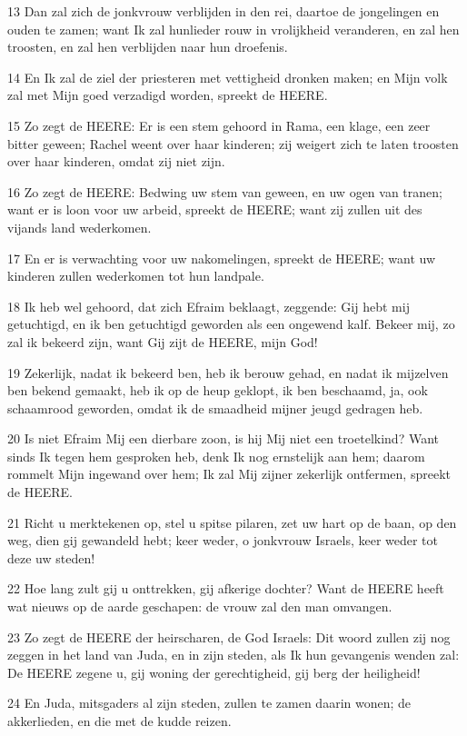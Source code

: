 \par 13 Dan zal zich de jonkvrouw verblijden in den rei, daartoe de jongelingen en ouden te zamen; want Ik zal hunlieder rouw in vrolijkheid veranderen, en zal hen troosten, en zal hen verblijden naar hun droefenis.
\par 14 En Ik zal de ziel der priesteren met vettigheid dronken maken; en Mijn volk zal met Mijn goed verzadigd worden, spreekt de HEERE.
\par 15 Zo zegt de HEERE: Er is een stem gehoord in Rama, een klage, een zeer bitter geween; Rachel weent over haar kinderen; zij weigert zich te laten troosten over haar kinderen, omdat zij niet zijn.
\par 16 Zo zegt de HEERE: Bedwing uw stem van geween, en uw ogen van tranen; want er is loon voor uw arbeid, spreekt de HEERE; want zij zullen uit des vijands land wederkomen.
\par 17 En er is verwachting voor uw nakomelingen, spreekt de HEERE; want uw kinderen zullen wederkomen tot hun landpale.
\par 18 Ik heb wel gehoord, dat zich Efraim beklaagt, zeggende: Gij hebt mij getuchtigd, en ik ben getuchtigd geworden als een ongewend kalf. Bekeer mij, zo zal ik bekeerd zijn, want Gij zijt de HEERE, mijn God!
\par 19 Zekerlijk, nadat ik bekeerd ben, heb ik berouw gehad, en nadat ik mijzelven ben bekend gemaakt, heb ik op de heup geklopt, ik ben beschaamd, ja, ook schaamrood geworden, omdat ik de smaadheid mijner jeugd gedragen heb.
\par 20 Is niet Efraim Mij een dierbare zoon, is hij Mij niet een troetelkind? Want sinds Ik tegen hem gesproken heb, denk Ik nog ernstelijk aan hem; daarom rommelt Mijn ingewand over hem; Ik zal Mij zijner zekerlijk ontfermen, spreekt de HEERE.
\par 21 Richt u merktekenen op, stel u spitse pilaren, zet uw hart op de baan, op den weg, dien gij gewandeld hebt; keer weder, o jonkvrouw Israels, keer weder tot deze uw steden!
\par 22 Hoe lang zult gij u onttrekken, gij afkerige dochter? Want de HEERE heeft wat nieuws op de aarde geschapen: de vrouw zal den man omvangen.
\par 23 Zo zegt de HEERE der heirscharen, de God Israels: Dit woord zullen zij nog zeggen in het land van Juda, en in zijn steden, als Ik hun gevangenis wenden zal: De HEERE zegene u, gij woning der gerechtigheid, gij berg der heiligheid!
\par 24 En Juda, mitsgaders al zijn steden, zullen te zamen daarin wonen; de akkerlieden, en die met de kudde reizen.
